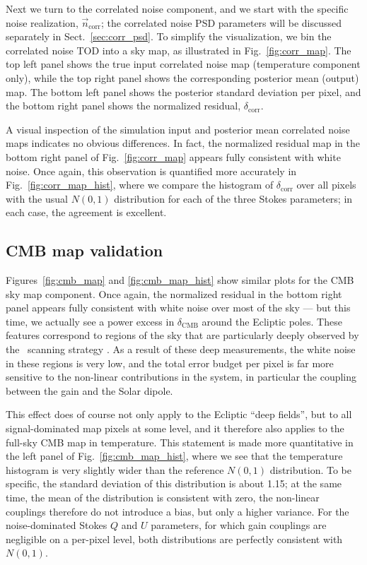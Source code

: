 \documentclass[twocolumn]{aa}%
\newcommand{\n}[0]{\vec{n}}
\begin{document}
Next we turn to the correlated noise component, and we start with the
specific noise realization, $\n_{\mathrm{corr}}$; the correlated noise
PSD parameters will be discussed separately in
Sect.~\ref{sec:corr_psd}. To simplify the visualization, we bin the
correlated noise TOD into a sky map, as illustrated in
Fig.~\ref{fig:corr_map}. The top left panel shows the true input
correlated noise map (temperature component only), while the top right
panel shows the corresponding posterior mean (output) map. The bottom
left panel shows the posterior standard deviation per pixel, and the
bottom right panel shows the normalized residual,
$\delta_{\mathrm{corr}}$.

A visual inspection of the simulation input and posterior mean
correlated noise maps indicates no obvious differences. In fact, the
normalized residual map in the bottom right panel of 
Fig.~\ref{fig:corr_map} appears fully
consistent with white noise. Once again, this observation is
quantified more accurately in Fig.~\ref{fig:corr_map_hist}, where we
compare the histogram of $\delta_{\mathrm{corr}}$ over all pixels with
the usual $N(0,1)$ distribution for each of the three Stokes
parameters; in each case, the agreement is excellent.

\subsection{CMB map validation}


Figures~\ref{fig:cmb_map} and \ref{fig:cmb_map_hist} show similar
plots for the CMB sky map component. Once again, the normalized
residual in the bottom right panel appears fully consistent with white
noise over most of the sky --- but this time, we actually see a power
excess in $\delta_{\mathrm{CMB}}$ around the Ecliptic poles. These
features correspond to regions of the sky that are particularly deeply
observed by the \Planck\ scanning strategy \citep{planck2013-p01}. As
a result of these deep measurements, the white noise in these regions
is very low, and the total error budget per pixel is far more
sensitive to the non-linear contributions in the system, in particular
the coupling between the gain and the Solar dipole.

This effect does of course not only apply to the Ecliptic ``deep
fields'', but to all signal-dominated map pixels at some level, and it
therefore also applies to the full-sky CMB map in temperature. This
statement is made more quantitative in the left panel of
Fig.~\ref{fig:cmb_map_hist}, where we see that the temperature
histogram is very slightly wider than the reference $N(0,1)$
distribution. To be specific, the standard deviation of this
distribution is about 1.15; at the same time, the mean of the
distribution is consistent with zero, the non-linear couplings
therefore do not introduce a bias, but only a higher variance. For the
noise-dominated Stokes $Q$ and $U$ parameters, for which gain
couplings are negligible on a per-pixel level, both distributions are
perfectly consistent with $N(0,1)$.
\end{document}
